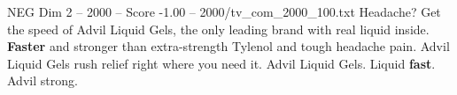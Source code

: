 \begin{textsample}{NEG Dim 2 – 2000 – Score -1.00 – 2000/tv\_com\_2000\_100.txt}  \label{ex:f2_neg_011}
Headache?
Get the speed of Advil Liquid Gels, the only leading brand with real liquid inside. \textbf{Faster} and stronger than extra-strength Tylenol and tough headache pain.
Advil Liquid Gels rush relief right where you need it.
Advil Liquid Gels.
Liquid \textbf{fast}.
Advil strong.

\end{textsample}

